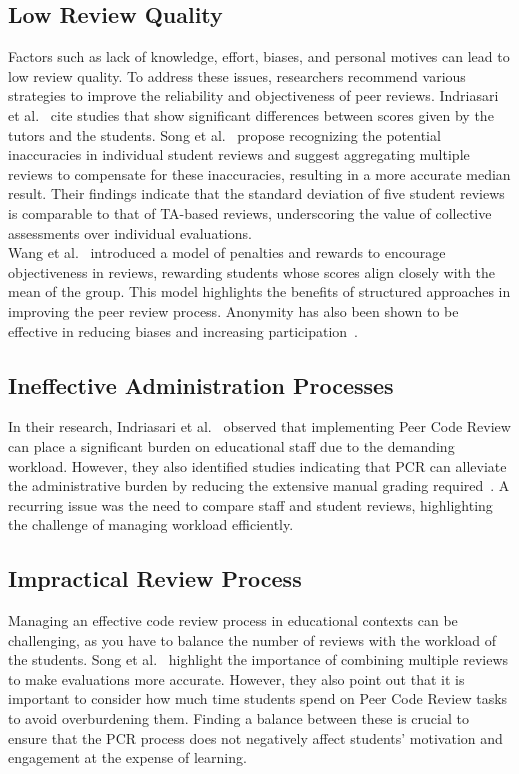 \subsection{Low Review Quality}
Factors such as lack of knowledge, effort, biases, and personal motives can lead to low review quality. To address these issues, researchers recommend various strategies to improve the reliability and objectiveness of peer reviews. Indriasari et al.~\cite{Indriasari_Luxton_2020} cite studies that show significant differences between scores given by the tutors and the students. Song et al.~\cite{Song_Goldstein_Sakr_2020} propose recognizing the potential inaccuracies in individual student reviews and suggest aggregating multiple reviews to compensate for these inaccuracies, resulting in a more accurate median result. Their findings indicate that the standard deviation of five student reviews is comparable to that of TA-based reviews, underscoring the value of collective assessments over individual evaluations.\\

Wang et al.~\cite{Wang_evolution} introduced a model of penalties and rewards to encourage objectiveness in reviews, rewarding students whose scores align closely with the mean of the group. This model highlights the benefits of structured approaches in improving the peer review process. Anonymity has also been shown to be effective in reducing biases and increasing participation~\cite{Indriasari_Luxton_2020, Ada_Majid_2022}. \\

\subsection{Ineffective Administration Processes}
In their research, Indriasari et al.~\cite{Indriasari_Luxton_2020} observed that implementing Peer Code Review can place a significant burden on educational staff due to the demanding workload. However, they also identified studies indicating that PCR can alleviate the administrative burden by reducing the extensive manual grading required~\cite{Hundhausen_Agrawal_Agarwal_2013}. A recurring issue was the need to compare staff and student reviews, highlighting the challenge of managing workload efficiently. \\

\subsection{Impractical Review Process} \label{Impractical_review_process}
Managing an effective code review process in educational contexts can be challenging, as you have to balance the number of reviews with the workload of the students. Song et al.~\cite{Song_Goldstein_Sakr_2020} highlight the importance of combining multiple reviews to make evaluations more accurate. However, they also point out that it is important to consider how much time students spend on Peer Code Review tasks to avoid overburdening them. Finding a balance between these is crucial to ensure that the PCR process does not negatively affect students' motivation and engagement at the expense of learning. \\

